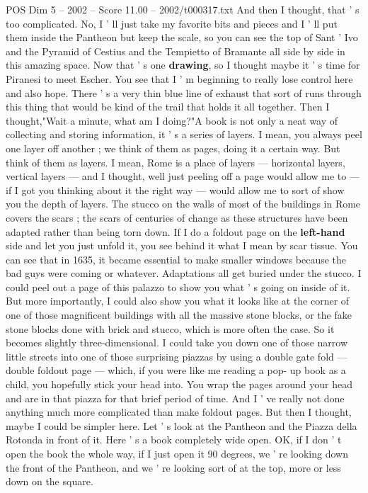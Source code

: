 \begin{textsample}{POS Dim 5 – 2002 – Score 11.00 – 2002/t000317.txt}
And then I thought, that ' s too complicated.
No, I ' ll just take my favorite bits and pieces and I ' ll put them inside the Pantheon but keep the scale, so you can see the top of Sant ' Ivo and the Pyramid of Cestius and the Tempietto of Bramante all side by side in this amazing space.
Now that ' s one \textbf{drawing}, so I thought maybe it ' s time for Piranesi to meet Escher.
You see that I ' m beginning to really lose control here and also hope.
There ' s a very thin blue line of exhaust that sort of runs through this thing that would be kind of the trail that holds it all together.
Then I thought,"Wait a minute, what am I doing?"A book is not only a neat way of collecting and storing information, it ' s a series of layers.
I mean, you always peel one layer off another ; we think of them as pages, doing it a certain way.
But think of them as layers.
I mean, Rome is a place of layers — horizontal layers, vertical layers — and I thought, well just peeling off a page would allow me to — if I got you thinking about it the right way — would allow me to sort of show you the depth of layers.
The stucco on the walls of most of the buildings in Rome covers the scars ; the scars of centuries of change as these structures have been adapted rather than being torn down.
If I do a foldout page on the \textbf{left-hand} side and let you just unfold it, you see behind it what I mean by scar tissue.
You can see that in 1635, it became essential to make smaller windows because the bad guys were coming or whatever.
Adaptations all get buried under the stucco.
I could peel out a page of this palazzo to show you what ' s going on inside of it.
But more importantly, I could also show you what it looks like at the corner of one of those magnificent buildings with all the massive stone blocks, or the fake stone blocks done with brick and stucco, which is more often the case.
So it becomes slightly three-dimensional.
I could take you down one of those narrow little streets into one of those surprising piazzas by using a double gate fold — double foldout page — which, if you were like me reading a pop- up book as a child, you hopefully stick your head into.
You wrap the pages around your head and are in that piazza for that brief period of time.
And I ' ve really not done anything much more complicated than make foldout pages.
But then I thought, maybe I could be simpler here.
Let ' s look at the Pantheon and the Piazza della Rotonda in front of it.
Here ' s a book completely wide open.
OK, if I don ' t open the book the whole way, if I just open it 90 degrees, we ' re looking down the front of the Pantheon, and we ' re looking sort of at the top, more or less down on the square.

\end{textsample}
